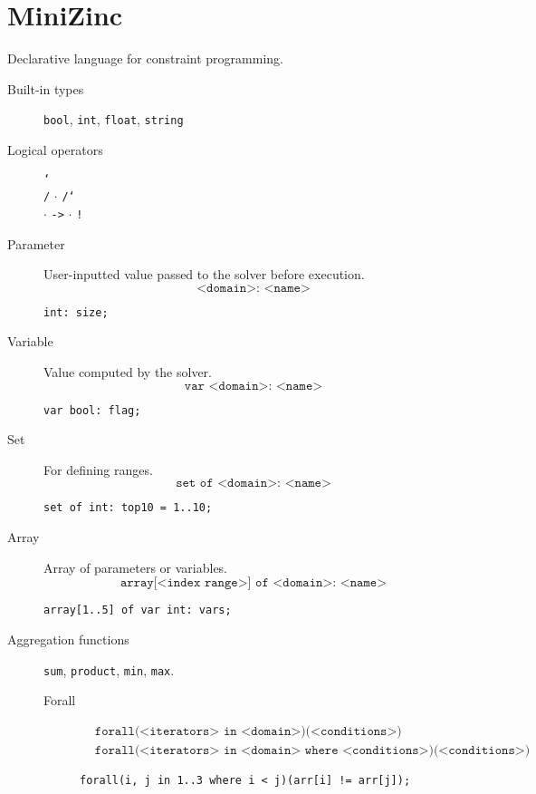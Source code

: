 \section{MiniZinc}

Declarative language for constraint programming.

\begin{description}
    \item[Built-in types]  
        \texttt{bool}, \texttt{int}, \texttt{float}, \texttt{string}
    
    \item[Logical operators]  
        \texttt{\char`\\/} $\cdot$ \texttt{/\char`\\} $\cdot$ \texttt{->} $\cdot$ \texttt{!}

    \item[Parameter]  
        User-inputted value passed to the solver before execution.
        \[ \texttt{<domain>: <name>} \]
        \begin{example} \texttt{int: size;} \end{example}

    \item[Variable]  
        Value computed by the solver.
        \[ \texttt{var <domain>: <name>} \]
        \begin{example} \texttt{var bool: flag;} \end{example}
    
    \item[Set]  
        For defining ranges.
        \[ \texttt{set of <domain>: <name>} \]
        \begin{example} \texttt{set of int: top10 = 1..10;} \end{example}

    \item[Array]  
        Array of parameters or variables.
        \[ \texttt{array[<index range>] of <domain>: <name>} \]
        \begin{example} \texttt{array[1..5] of var int: vars;} \end{example}

    \item[Aggregation functions] 
        \texttt{sum}, \texttt{product}, \texttt{min}, \texttt{max}.

        \begin{description}
            \item[Forall] 
                \[ 
                    \begin{split}
                        &\texttt{forall(<iterators> in <domain>)}\texttt{(<conditions>) } \\
                        &\texttt{forall(<iterators> in <domain> where <conditions>)}\texttt{(<conditions>) }
                    \end{split}
                \]
                \begin{example} \texttt{forall(i, j in 1..3 where i < j)(arr[i] != arr[j]);} \end{example}
            

\end{description}
\end{description}
